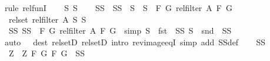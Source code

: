 \begin{isabellebody}
%
\isadelimproof
%
\endisadelimproof
%
\isatagproof
{}\isamarkupfalse%
{\isacharparenleft}{\kern0pt}rule\ rel{\isacharunderscore}{\kern0pt}funI{\isacharparenright}{\kern0pt}\isanewline
\ \ \isamarkupfalse%
\ S\ S{\isacharprime}{\kern0pt}\isanewline
\ \ \isamarkupfalse%
\ SS{\isacharprime}{\kern0pt}\ \ {\isachardoublequoteopen}SS{\isacharprime}{\kern0pt}\ {\isacharequal}{\kern0pt}\ S\ {\isasymtimes}\ S{\isacharprime}{\kern0pt}\ {\isasyminter}\ {\isacharbraceleft}{\kern0pt}{\isacharparenleft}{\kern0pt}F{\isacharcomma}{\kern0pt}\ G{\isacharparenright}{\kern0pt}{\isachardot}{\kern0pt}\ rel{\isacharunderscore}{\kern0pt}filter\ A\ F\ G{\isacharbraceright}{\kern0pt}{\isachardoublequoteclose}\isanewline
\ \ \isamarkupfalse%
\ {\isachardoublequoteopen}rel{\isacharunderscore}{\kern0pt}set\ {\isacharparenleft}{\kern0pt}rel{\isacharunderscore}{\kern0pt}filter\ A{\isacharparenright}{\kern0pt}\ S\ S{\isacharprime}{\kern0pt}{\isachardoublequoteclose}\isanewline
\ \ \isamarkupfalse%
\ \isamarkupfalse%
\ SS{\isacharprime}{\kern0pt}{\isacharcolon}{\kern0pt}\ {\isachardoublequoteopen}SS{\isacharprime}{\kern0pt}\ {\isasymsubseteq}\ {\isacharbraceleft}{\kern0pt}{\isacharparenleft}{\kern0pt}F{\isacharcomma}{\kern0pt}\ G{\isacharparenright}{\kern0pt}{\isachardot}{\kern0pt}\ rel{\isacharunderscore}{\kern0pt}filter\ A\ F\ G{\isacharbraceright}{\kern0pt}{\isachardoublequoteclose}\ \ {\isacharbrackleft}{\kern0pt}simp{\isacharbrackright}{\kern0pt}{\isacharcolon}{\kern0pt}\ {\isachardoublequoteopen}S\ {\isacharequal}{\kern0pt}\ fst\ {\isacharbackquote}{\kern0pt}\ SS{\isacharprime}{\kern0pt}{\isachardoublequoteclose}\ {\isachardoublequoteopen}S{\isacharprime}{\kern0pt}\ {\isacharequal}{\kern0pt}\ snd\ {\isacharbackquote}{\kern0pt}\ SS{\isacharprime}{\kern0pt}{\isachardoublequoteclose}\isanewline
\ \ \ \ \isamarkupfalse%
{\isacharparenleft}{\kern0pt}auto\ {}\ {}\ dest{\isacharcolon}{\kern0pt}\ rel{\isacharunderscore}{\kern0pt}setD{}\ rel{\isacharunderscore}{\kern0pt}setD{}\ intro{\isacharcolon}{\kern0pt}\ rev{\isacharunderscore}{\kern0pt}image{\isacharunderscore}{\kern0pt}eqI\ simp\ add{\isacharcolon}{\kern0pt}\ SS{\isacharprime}{\kern0pt}{\isacharunderscore}{\kern0pt}def{\isacharparenright}{\kern0pt}\isanewline
\ \ \isamarkupfalse%
\ SS{\isacharprime}{\kern0pt}\ \isamarkupfalse%
\ Z\ \ Z{\isacharcolon}{\kern0pt}\ {\isachardoublequoteopen}{\isasymAnd}F\ G{\isachardot}{\kern0pt}\ {\isacharparenleft}{\kern0pt}F{\isacharcomma}{\kern0pt}\ G{\isacharparenright}{\kern0pt}\ {\isasymin}\ SS{\isacharprime}{\kern0pt}\ {\isasymLongrightarrow}\isanewline

\end{isabellebody}
